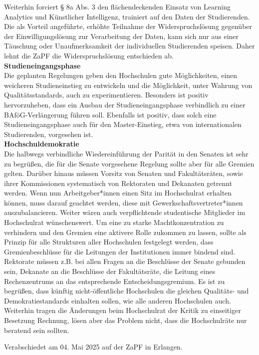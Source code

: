 \documentclass[DIV=calc]{scrartcl}
\begin{document}
Weiterhin forciert § 8a Abs. 3 den flächendeckenden Einsatz von Learning Analytics und Künstlicher Intelligenz, trainiert auf den Daten der Studierenden. Die als Vorteil angeführte, erhöhte Teilnahme der Widerspruchslösung gegenüber der Einwilligungslösung zur Verarbeitung der Daten, kann sich nur aus einer Täuschung oder Unaufmerksamkeit der individuellen Studierenden speisen. Daher lehnt die ZaPF die Widerspruchslösung entschieden ab.\\

\textbf{Studieneingangsphase}\\
Die geplanten Regelungen geben den Hochschulen gute Möglichkeiten, einen weicheren Studieneinstieg zu entwickeln und die Möglichkeit, unter Wahrung von Qualitätsstandards, auch zu experimentieren. Besonders ist positiv hervorzuheben, dass ein Ausbau der Studieneingangsphase
verbindlich zu einer BAföG-Verlängerung führen soll. Ebenfalls ist positiv, dass solch eine Studieneingangsphase auch für den Master-Einstieg, etwa von internationalen Studierenden, vorgesehen ist.\\

\textbf{Hochschuldemokratie}\\
Die halbwegs verbindliche Wiedereinführung der Parität in den Senaten ist sehr zu begrüßen, die für die Senate vorgesehene Regelung sollte aber für alle Gremien gelten. Darüber hinaus müssen Vorsitz von Senaten und Fakultätsräten, sowie ihrer Kommissionen systematisch von Rektoraten und Dekanaten getrennt werden.
Wenn nun Arbeitgeber*innen einen Sitz im Hochschulrat erhalten können, muss darauf geachtet werden, diese mit Gewerkschaftsvertreter*innen auszubalancieren. Weiter wären auch verpflichtende studentische Mitglieder im Hochschulrat wünschenswert.
Um eine zu starke Machtkonzentration zu verhindern und den Gremien eine aktivere Rolle zukommen zu lassen, sollte als Prinzip für alle Strukturen aller Hochschulen festgelegt werden, dass Gremienbeschlüsse für die Leitungen der Institutionen immer
bindend sind. Rektorate müssen z.B. bei allen Fragen an die Beschlüsse der Senate gebunden sein, Dekanate an die Beschlüsse der Fakultätsräte, die Leitung eines Rechenzentrums an das entsprechende Entscheidungsgremium.
Es ist zu begrüßen, dass künftig nicht-öffentliche Hochschulen die gleichen
Qualitäts- und Demokratiestandards einhalten sollen, wie alle anderen Hochschulen auch. Weiterhin tragen die Änderungen beim Hochschulrat der Kritik zu einseitiger Besetzung Rechnung, lösen aber das Problem nicht, dass die Hochschulräte nur beratend sein sollten. \\ 


%
\vfill
\begin{flushright}
	Verabschiedet am 04. Mai 2025 
	auf der ZaPF in Erlangen.
\end{flushright}
\end{document}
